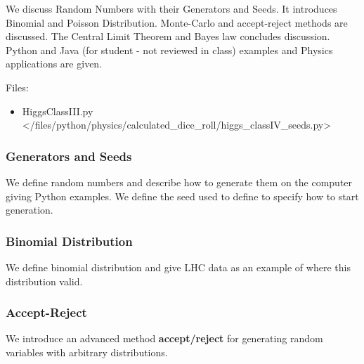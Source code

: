 We discuss Random Numbers with their Generators and Seeds. It introduces
Binomial and Poisson Distribution. Monte-Carlo and accept-reject methods
are discussed. The Central Limit Theorem and Bayes law concludes
discussion. Python and Java (for student - not reviewed in class)
examples and Physics applications are given.


Files:

\begin{itemize}
\tightlist
\item
  HiggsClassIII.py \textless{}/files/python/physics/calculated\_dice\_roll/higgs\_classIV\_seeds.py\textgreater{}
\end{itemize}

\subsubsection{Generators and Seeds}\label{generators-and-seeds}

We define random numbers and describe how to generate them on the
computer giving Python examples. We define the seed used to define to
specify how to start generation.



\subsubsection{Binomial Distribution}\label{binomial-distribution}

We define binomial distribution and give LHC data as an example of where
this distribution valid.


\subsubsection{Accept-Reject}\label{accept-reject}

We introduce an advanced method \textbf{accept/reject} for generating
random variables with arbitrary distributions.


